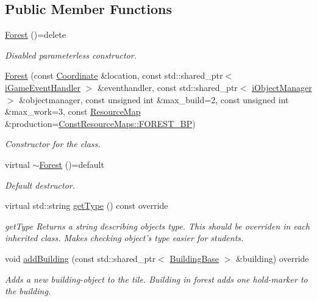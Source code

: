 \subsection*{Public Member Functions}
\begin{DoxyCompactItemize}
\item 
\hyperlink{classCourse_1_1Forest_a479a9c69f82dcd8cc2d0db81f067472b}{Forest} ()=delete
\begin{DoxyCompactList}\small\item\em Disabled parameterless constructor. \end{DoxyCompactList}\item 
\hyperlink{classCourse_1_1Forest_ab5e80525c9f03c02af4fd8e674d59485}{Forest} (const \hyperlink{classCourse_1_1Coordinate}{Coordinate} \&location, const std\-::shared\-\_\-ptr$<$ \hyperlink{classCourse_1_1iGameEventHandler}{i\-Game\-Event\-Handler} $>$ \&eventhandler, const std\-::shared\-\_\-ptr$<$ \hyperlink{classCourse_1_1iObjectManager}{i\-Object\-Manager} $>$ \&objectmanager, const unsigned int \&max\-\_\-build=2, const unsigned int \&max\-\_\-work=3, const \hyperlink{namespaceCourse_ab9a46ed9cd00485e318e5731ea2f78d9}{Resource\-Map} \&production=\hyperlink{namespaceCourse_1_1ConstResourceMaps_a7dcae89456b97bd487124b43c1b63a1c}{Const\-Resource\-Maps\-::\-F\-O\-R\-E\-S\-T\-\_\-\-B\-P})
\begin{DoxyCompactList}\small\item\em Constructor for the class. \end{DoxyCompactList}\item 
virtual \hyperlink{classCourse_1_1Forest_ac8e55f196786f07e92866e6ca1a6ae44}{$\sim$\-Forest} ()=default
\begin{DoxyCompactList}\small\item\em Default destructor. \end{DoxyCompactList}\item 
virtual std\-::string \hyperlink{classCourse_1_1Forest_a783378b8f5c1ec5d0c5c4a771291a902}{get\-Type} () const override
\begin{DoxyCompactList}\small\item\em get\-Type Returns a string describing objects type. This should be overriden in each inherited class. Makes checking object's type easier for students. \end{DoxyCompactList}\item 
void \hyperlink{classCourse_1_1Forest_a16ad633cd25afa705fbaefbc42efc2ae}{add\-Building} (const std\-::shared\-\_\-ptr$<$ \hyperlink{classCourse_1_1BuildingBase}{Building\-Base} $>$ \&building) override
\begin{DoxyCompactList}\small\item\em Adds a new building-\/object to the tile. Building in forest adds one hold-\/marker to the building. \end{DoxyCompactList}\end{DoxyCompactItemize}
